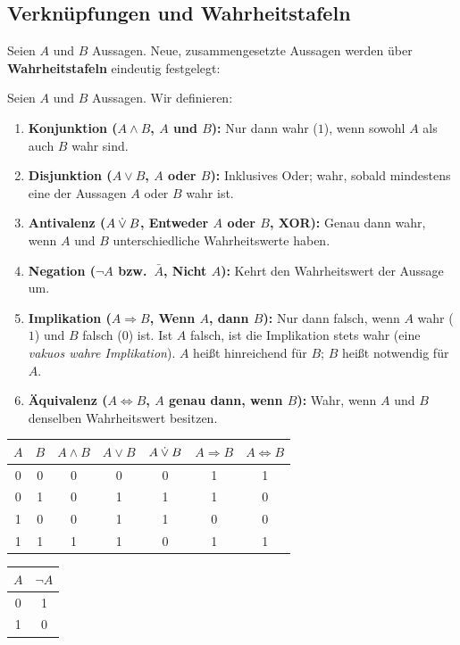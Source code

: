 \subsection{Verknüpfungen und Wahrheitstafeln}

Seien $A$ und $B$ Aussagen. Neue, zusammengesetzte Aussagen werden über \textbf{Wahrheitstafeln} eindeutig festgelegt:

\begin{definition}
Seien $A$ und $B$ Aussagen. Wir definieren:
\begin{enumerate}
    \item \textbf{Konjunktion ($A \land B$, \glqq $A$ und $B$\grqq):} Nur dann wahr ($1$), wenn sowohl $A$ als auch $B$ wahr sind.
    \item \textbf{Disjunktion ($A \lor B$, \glqq $A$ oder $B$\grqq):} Inklusives Oder; wahr, sobald mindestens eine der Aussagen $A$ oder $B$ wahr ist.
    \item \textbf{Antivalenz ($A \mathbin{\dot{\lor}} B$, \glqq Entweder $A$ oder $B$\grqq, XOR):} Genau dann wahr, wenn $A$ und $B$ unterschiedliche Wahrheitswerte haben.
    \item \textbf{Negation ($\neg A$ bzw.\ $\bar{A}$, \glqq Nicht $A$\grqq):} Kehrt den Wahrheitswert der Aussage um.
    \item \textbf{Implikation ($A \Rightarrow B$, \glqq Wenn $A$, dann $B$\grqq):} Nur dann falsch, wenn $A$ wahr ($1$) und $B$ falsch ($0$) ist. Ist $A$ falsch, ist die Implikation stets wahr (eine \emph{vakuos wahre Implikation}). $A$ heißt hinreichend für $B$; $B$ heißt notwendig für $A$.
    \item \textbf{Äquivalenz ($A \Leftrightarrow B$, \glqq $A$ genau dann, wenn $B$\grqq):} Wahr, wenn $A$ und $B$ denselben Wahrheitswert besitzen.
\end{enumerate}
\end{definition}

\begin{center}
\renewcommand{\arraystretch}{1.15}
\begin{tabular}{ccccccc}
    \toprule
    $A$ & $B$ & $A \land B$ & $A \lor B$ & $A \mathbin{\dot{\lor}} B$ & $A \Rightarrow B$ & $A \Leftrightarrow B$ \\
    \midrule
    0 & 0 & 0 & 0 & 0 & 1 & 1 \\
    0 & 1 & 0 & 1 & 1 & 1 & 0 \\
    1 & 0 & 0 & 1 & 1 & 0 & 0 \\
    1 & 1 & 1 & 1 & 0 & 1 & 1 \\
    \bottomrule
\end{tabular}
\qquad
\begin{tabular}{cc}
    \toprule
    $A$ & $\neg A$ \\
    \midrule
    0 & 1 \\
    1 & 0 \\
    \bottomrule
\end{tabular}
\end{center}


